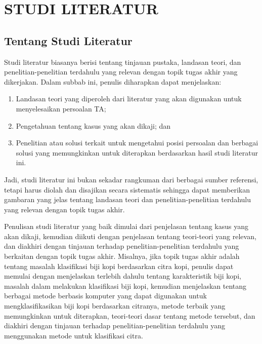 \cleardoublepage %
\chapter{STUDI LITERATUR}
\label{chap:studi-literatur}

\iffalse

\section{Tentang Studi Literatur}
Studi literatur biasanya berisi tentang tinjauan pustaka, landasan teori, dan penelitian-penelitian terdahulu yang relevan dengan topik tugas akhir yang dikerjakan.
Dalam subbab ini, penulis diharapkan dapat menjelaskan:
\begin{enumerate}
  \item Landasan teori yang diperoleh dari literatur yang akan digunakan untuk menyelesaikan persoalan TA;
  \item Pengetahuan tentang kasus yang akan dikaji; dan
  \item Penelitian atau solusi terkait untuk mengetahui posisi persoalan dan berbagai solusi yang memungkinkan untuk diterapkan berdasarkan hasil studi literatur ini.
\end{enumerate}
Jadi, studi literatur ini bukan sekadar rangkuman dari berbagai sumber referensi, tetapi harus diolah dan disajikan secara sistematis sehingga dapat memberikan gambaran yang jelas tentang landasan teori dan penelitian-penelitian terdahulu yang relevan dengan topik tugas akhir.

Penulisan studi literatur yang baik dimulai dari penjelasan tentang kasus yang akan dikaji, kemudian diikuti dengan penjelasan tentang teori-teori yang relevan, dan diakhiri dengan tinjauan terhadap penelitian-penelitian terdahulu yang berkaitan dengan topik tugas akhir.
Misalnya, jika topik tugas akhir adalah tentang masalah klasifikasi biji kopi berdasarkan citra kopi,
penulis dapat memulai dengan menjelaskan terlebih dahulu tentang karakteristik biji kopi, masalah dalam melakukan klasifikasi biji kopi,
kemudian menjelaskan tentang berbagai metode berbasis komputer yang dapat digunakan untuk mengklasifikasikan biji kopi berdasarkan citranya,
metode terbaik yang memungkinkan untuk diterapkan, teori-teori dasar tentang metode tersebut, dan diakhiri dengan tinjauan terhadap penelitian-penelitian terdahulu yang menggunakan metode untuk klasifikasi citra.

